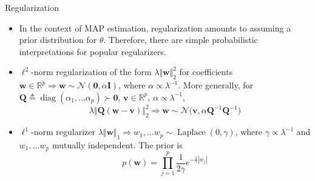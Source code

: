 \documentclass{beamer}
\numberwithin{equation}{section}
\begin{document}
\begin{frame}{Regularization}
    \begin{itemize}
        \item
        In the context of MAP estimation, regularization amounts to assuming a
        prior distribution for $ \theta $. Therefore, there are simple
        probabilistic interpretations for popular regularizers.

        \item
        $ \ell^2 $-norm regularization of the form
        $ \lambda\Vert\mathbf{w}\Vert_2^2 $ for coefficients $ \mathbf{w} \in
        \mathbb{R}^p \Rightarrow \mathbf{w} \sim
        \mathcal{N}(\mathbf{0}, \alpha\mathbf{I}) $, where
        $ \alpha \propto \lambda^{-1} $. More generally, for
        $ \mathbf{Q} \triangleq \operatorname{diag}(\alpha_1, \ldots \alpha_p)
        \succ \mathbf{0} $, $ \mathbf{v} \in \mathbb{R}^p $,
        $ \alpha \propto \lambda^{-1} $,
        \begin{equation*}
            \lambda\Vert\mathbf{Q(w - \mathbf{v})}\Vert_2^2 \Rightarrow
            \mathbf{w} \sim \mathcal{N}\big(
                \mathbf{v}, \alpha\mathbf{Q}^{-1}\mathbf{Q}^{-1}
            \big)
        \end{equation*}

        \item
        $ \ell^1 $-norm regularizer $ \lambda\Vert\mathbf{w}\Vert_1 \Rightarrow
        w_1, \ldots w_p \sim \operatorname{Laplace}(0, \gamma) $, where
        $ \gamma \propto \lambda^{-1} $ and $ w_1, \ldots w_p $ mutually
        independent. The prior is
        \begin{equation*}
            p(\mathbf{w}) = \prod_{j = 1}^p\frac{1}{2\gamma}
            e^{-\frac{1}{\gamma}|w_j|}
        \end{equation*}
    \end{itemize}
\end{frame}
\end{document}
